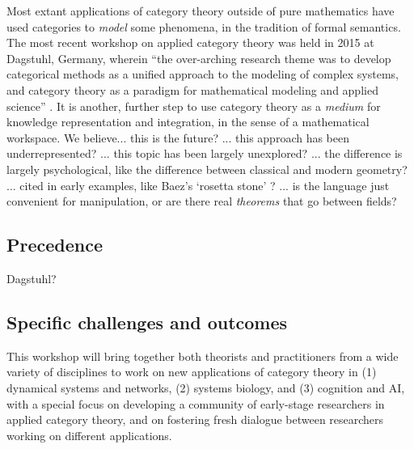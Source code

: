 \documentclass{article}
\newcommand{\redout}[1]{{\color{red}#1}}
\begin{document}
Most extant applications of category theory outside of pure mathematics have used categories to \emph{model} some phenomena, in the tradition of formal semantics. The most recent workshop on applied category theory was held in 2015 at Dagstuhl, Germany, wherein ``the over-arching research theme was to develop categorical methods as a unified approach to the modeling of complex systems, and category theory as a paradigm for mathematical modeling and applied science'' \cite{dagstuhl}. It is another, further step to use category theory as a \emph{medium} for knowledge representation and integration, in the sense of a mathematical workspace. \redout{We believe... this is the future? ... this approach has been underrepresented? ... this topic has been largely unexplored? ... the difference is largely psychological, like the difference between classical and modern geometry? ... cited in early examples, like Baez's `rosetta stone' \cite{baez_rosetta}? ... is the language just convenient for manipulation, or are there real \emph{theorems} that go between fields?}



\subsection{Precedence}
Dagstuhl?

\subsection{Specific challenges and outcomes}
This workshop will bring together both theorists and practitioners from a wide variety of disciplines to work on new applications of category theory in (1) dynamical systems and networks, (2) systems biology, and (3) cognition and AI, with a special focus on developing a community of early-stage researchers in applied category theory, and on fostering fresh dialogue between researchers working on different applications.
\end{document}
